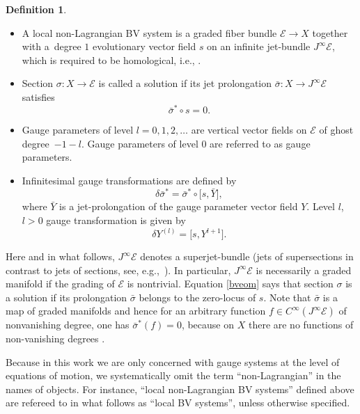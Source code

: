 \documentclass[pdftex]{sigma}
\numberwithin{equation}{section}
\theoremstyle{definition}
\newtheorem{Definition}[Theorem]{Definition}
\newcommand{\commut}[2]{[#1{,}\,#2]}
\newcommand{\half}{\mathchoice{%
 \ffrac{1}{2}}{\frac{1}{2}}{\frac{1}{2}}{\frac{1}{2}}}
\newcommand{\ffrac}[2]{\raisebox{.5pt}%
 {\footnotesize$\displaystyle\frac{#1}{#2}$}\kern1pt}
\def\cE{\mathcal{E}}
\begin{document}
\begin{Definition}%
\quad
\begin{itemize}\itemsep=0pt
\item
 A local non-Lagrangian BV system is a graded fiber bundle $\mathcal{E}\rightarrow X$ together with a~degree $1$ evolutionary vector field $s$ on an infinite jet-bundle $J^{\infty}\mathcal{E}$, which is required to be homological, i.e., \smash{$s^2=\half\commut{s}{s}=0$}.

 \item Section $\sigma\colon X\rightarrow \mathcal{E}$ is called a solution if its jet prolongation $\bar{\sigma}\colon X\rightarrow J^{\infty}\mathcal{E}$ satisfies
 \begin{equation}\label{bveom}
 \bar{\sigma}^*\circ s=0.
 \end{equation}

\item Gauge parameters of level $l=0,1,2,\dots$ are vertical vector fields on $\mathcal{E}$ of ghost degree~${-1-l}$. Gauge parameters of level $0$ are referred to as gauge parameters.

\item Infinitesimal gauge transformations are defined by
 \begin{equation*}%
 \delta\bar{\sigma}^*=\bar{\sigma}^*\circ\bigl[s, \bar Y\bigr],
 \end{equation*}
 where $\bar{Y}$ is a jet-prolongation of the gauge parameter vector field $Y$. Level $l$, $l>0$ gauge transformation is given by
 \begin{equation*}
 \delta Y^{(l)}=\bigl[s,Y^{l+1}\bigr].
 \end{equation*}
\end{itemize}
\end{Definition}
Here and in what follows, $J^{\infty}\cE$ denotes a superjet-bundle (jets of supersections in contrast to jets of sections, see, e.g.,~\cite{bonavolonta2013}). In particular, $J^{\infty}\cE$ is necessarily a graded manifold if the grading of $\cE$ is nontrivial. Equation \eqref{bveom} says that section $\sigma$ is a solution if its prolongation $\bar\sigma$ belongs to the zero-locus of $s$. Note that $\bar{\sigma}$ is a map of graded manifolds and hence for an arbitrary function $f\in C^{\infty}(J^{\infty}\mathcal{E})$ of nonvanishing degree, one has $\bar{\sigma}^*(f)=0$, because on $X$ there are no functions of non-vanishing degrees .

Because in this work we are only concerned with gauge systems at the level of equations of motion, we systematically omit the term ``non-Lagrangian'' in the names of objects. For instance, ``local non-Lagrangian BV systems'' defined above are refereed to in what follows as ``local BV systems'', unless otherwise specified.
\end{document}
